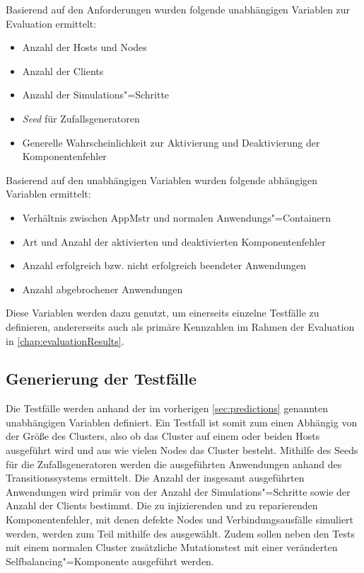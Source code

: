 Basierend auf den Anforderungen wurden folgende unabhängigen Variablen zur Evaluation ermittelt:

\begin{itemize}
    \item Anzahl der Hosts und Nodes
    \item Anzahl der Clients
    \item Anzahl der Simulations"=Schritte
    \item \emph{Seed} für Zufallsgeneratoren
    \item Generelle Wahrscheinlichkeit zur Aktivierung und Deaktivierung der Komponentenfehler
\end{itemize}

Basierend auf den unabhängigen Variablen wurden folgende abhängigen Variablen ermittelt:

\begin{itemize}
    \item Verhältnis zwischen \ac{AppMstr} und normalen Anwendungs"=Containern
    \item Art und Anzahl der aktivierten und deaktivierten Komponentenfehler
    \item Anzahl erfolgreich bzw. nicht erfolgreich beendeter Anwendungen
    \item Anzahl abgebrochener Anwendungen
\end{itemize}

Diese Variablen werden dazu genutzt, um einerseits einzelne Testfälle zu definieren, andererseits auch als primäre Kennzahlen im Rahmen der Evaluation in \autoref{chap:evaluationResults}.

\subsection{Generierung der Testfälle}
\label{sec:testcaseGeneration}

Die Testfälle werden anhand der im vorherigen \autoref{sec:predictions} genannten unabhängigen Variablen definiert.
Ein Testfall ist somit zum einen Abhängig von der Größe des Clusters, also ob das Cluster auf einem oder beiden Hosts ausgeführt wird und aus wie vielen Nodes das Cluster besteht.
Mithilfe des Seeds für die Zufallsgeneratoren werden die ausgeführten Anwendungen anhand des Transitionssystems ermittelt.
Die Anzahl der insgesamt ausgeführten Anwendungen wird primär von der Anzahl der Simulations"=Schritte sowie der Anzahl der Clients bestimmt.
Die zu injizierenden und zu reparierenden Komponentenfehler, mit denen defekte Nodes und Verbindungsausfälle simuliert werden, werden zum Teil mithilfe des ausgewählt.
Zudem sollen neben den Tests mit einem normalen Cluster zusätzliche Mutationstest mit einer veränderten Selfbalancing"=Komponente ausgeführt werden.

